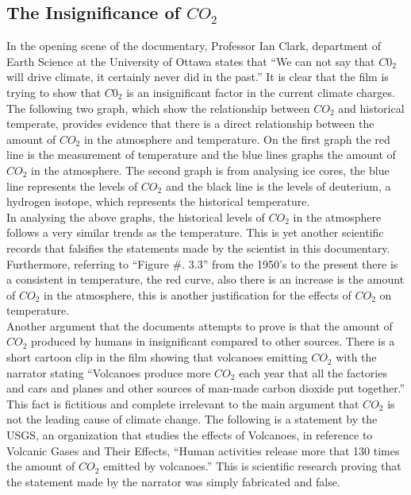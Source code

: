 \documentclass[12pt]{article}
\begin{document}
\subsection{The Insignificance of $CO_2$}

In the opening scene of the documentary, Professor Ian Clark, department of Earth Science at the University of Ottawa states that “We can not say that $C0_2$ will drive climate, it certainly never did in the past.” It is clear that the film is trying to show that $C0_2$ is an insignificant factor in the current climate charges. The following two graph, which show the relationship between $CO_2$ and historical temperate, provides evidence that there is a direct relationship between the amount of $CO_2$ in the atmosphere and temperature. On the first graph the red line is the measurement of temperature and the blue lines graphs the amount of $CO_2$ in the atmosphere. The second graph is from analysing ice cores, the blue line represents the levels of $CO_2$ and the black line is the levels of deuterium, a hydrogen isotope, which represents the historical temperature.\\


In analysing the above graphs, the historical levels of $CO_2$ in the atmosphere follows a very similar trends as the temperature. This is yet another scientific records that falsifies the statements made by the scientist in this documentary. Furthermore, referring to “Figure #. 3.3” from the 1950’s to the present there is a consistent in temperature, the red curve, also there is an increase is the amount of $CO_2$ in the atmosphere, this is another justification for the effects of $CO_2$ on temperature. \\

Another argument that the documents attempts to prove is that the amount of $CO_2$ produced by humans in insignificant compared to other sources. There is a short cartoon clip in the film showing that volcanoes emitting $CO_2$ with the narrator stating “Volcanoes produce more $CO_2$ each year that all the factories and cars and planes and other sources of man-made carbon dioxide put together.” This fact is fictitious and complete irrelevant to the main argument that $CO_2$ is not the leading cause of climate change. The following is a statement by the USGS, an organization that studies the effects of Volcanoes, in reference to Volcanic Gases and Their Effects, “Human activities release more that 130 times the amount of $CO_2$ emitted by volcanoes.” This is scientific research proving that the statement made by the narrator was simply fabricated and false. \\
\end{document}
